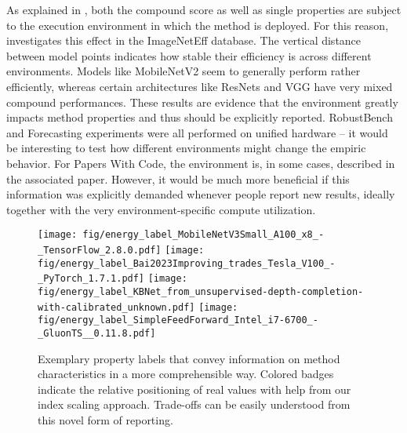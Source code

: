 \documentclass[sn-mathphys,Numbered]{sn-jnl}%
\theoremstyle{thmstylethree}%
\begin{document}
As explained in , both the compound score as well as single properties are subject to the execution environment in which the method is deployed.
For this reason,  investigates this effect in the ImageNetEff database.
The vertical distance between model points indicates how stable their efficiency is across different environments.
Models like MobileNetV2 \cite{howard_mobilenets_2017} seem to generally perform rather efficiently, whereas certain architectures like ResNets and VGG have very mixed compound performances.
These results are evidence that the environment greatly impacts method properties and thus should be explicitly reported.
RobustBench and Forecasting experiments were all performed on unified hardware -- it would be interesting to test how different environments might change the empiric behavior.
For Papers With Code, the environment is, in some cases, described in the associated paper.
However, it would be much more beneficial if this information was explicitly demanded whenever people report new results, ideally together with the very environment-specific compute utilization.

\begin{figure}
    \centering
    \texttt{[image: fig/energy\_label\_MobileNetV3Small\_A100\_x8\_-\_TensorFlow\_2.8.0.pdf]}
    \hfill
    \texttt{[image: fig/energy\_label\_Bai2023Improving\_trades\_Tesla\_V100\_-\_PyTorch\_1.7.1.pdf]}
    \hfill
    \texttt{[image: fig/energy\_label\_KBNet\_from\_unsupervised-depth-completion-with-calibrated\_unknown.pdf]}
    \hfill
    \texttt{[image: fig/energy\_label\_SimpleFeedForward\_Intel\_i7-6700\_-\_GluonTS\_\_0.11.8.pdf]}
    \caption{Exemplary property labels that convey information on method characteristics in a more comprehensible way. Colored badges indicate the relative positioning of real values with help from our index scaling approach. Trade-offs can be easily understood from this novel form of reporting.}
    \label{fig:labels}
\end{figure}
\end{document}
